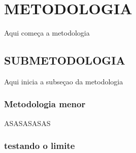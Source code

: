 \section{METODOLOGIA}

Aqui começa a metodologia
\subsection{SUBMETODOLOGIA}
Aqui inicia a subseçao da metodologia

\subsubsection{Metodologia menor}
ASASASASAS
\subsubsection{testando o limite}

